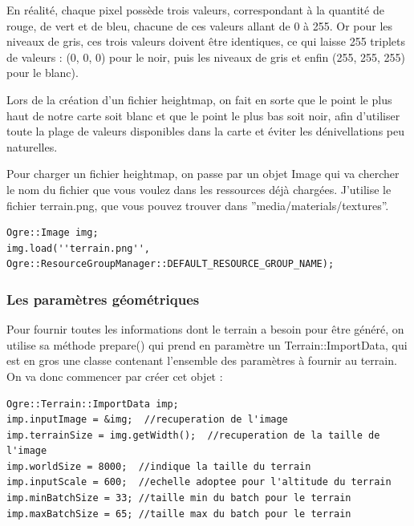 En r\'ealit\'e, chaque pixel poss\`ede trois valeurs, correspondant \`a la quantit\'e de rouge, de vert et de bleu, chacune de ces valeurs allant de 0 \`a 255. Or pour les niveaux de gris, ces trois valeurs doivent \^etre identiques, ce qui laisse 255 triplets de valeurs : (0, 0, 0) pour le noir, puis les niveaux de gris et enfin (255, 255, 255) pour le blanc).

Lors de la cr\'eation d'un fichier heightmap, on fait en sorte que le point le plus haut de notre carte soit blanc et que le point le plus bas soit noir, afin d'utiliser toute la plage de valeurs disponibles dans la carte et \'eviter les d\'enivellations peu naturelles.

Pour charger un fichier heightmap, on passe par un objet Image qui va chercher le nom du fichier que vous voulez dans les ressources d\'ej\`a charg\'ees. J'utilise le fichier terrain.png, que vous pouvez trouver dans ''media/materials/textures''.

\begin{lstlisting}[caption={Chargement du fichier heightmap}]
Ogre::Image img;
img.load(''terrain.png'', Ogre::ResourceGroupManager::DEFAULT_RESOURCE_GROUP_NAME);
\end{lstlisting}






\subsubsection{Les param\`etres g\'eom\'etriques}


Pour fournir toutes les informations dont le terrain a besoin pour \^etre g\'en\'er\'e, on utilise sa m\'ethode prepare() qui prend en param\`etre un Terrain::ImportData, qui est en gros une classe contenant l'ensemble des param\`etres \`a fournir au terrain. On va donc commencer par cr\'eer cet objet :

\begin{lstlisting}[caption={Cr\'eation de l'objet ImportData pour la d\'efinition des param\`etres \`a fournir au terrain}]
Ogre::Terrain::ImportData imp;
imp.inputImage = &img;  //recuperation de l'image
imp.terrainSize = img.getWidth();  //recuperation de la taille de l'image
imp.worldSize = 8000;  //indique la taille du terrain
imp.inputScale = 600;  //echelle adoptee pour l'altitude du terrain
imp.minBatchSize = 33; //taille min du batch pour le terrain
imp.maxBatchSize = 65; //taille max du batch pour le terrain
\end{lstlisting}

